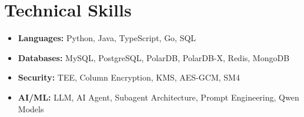 \documentclass[11pt,a4paper]{article}
\begin{document}
\vspace{4pt}

\section{Technical Skills}
\begin{itemize}
    \item \textbf{Languages:} Python, Java, TypeScript, Go, SQL
    \item \textbf{Databases:} MySQL, PostgreSQL, PolarDB, PolarDB-X, Redis, MongoDB
    \item \textbf{Security:} TEE, Column Encryption, KMS, AES-GCM, SM4
    \item \textbf{AI/ML:} LLM, AI Agent, Subagent Architecture, Prompt Engineering, Qwen Models
\end{itemize}
\end{document}

